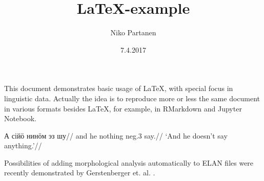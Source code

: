 \documentclass[a4paper, 12pt, english]{article}
\title{\LaTeX-example}
\author{Niko Partanen}
\date{7.4.2017}
\begin{document}
\maketitle 

This document demonstrates basic usage of \LaTeX, with special focus in linguistic data. Actually the idea is to reproduce more or less the same document in various formats besides LaTeX, for example, in RMarkdown and Jupyter Notebook.


\ex
\begingl
\gla А сійӧ нинӧм эз шу//
\glb and he nothing neg.3 say.//
\glft ‘And he doesn't say anything.’//
\endgl
\xe 

Possibilities of adding morphological analysis automatically to ELAN files were recently demonstrated by Gerstenberger et. al. \cite{gerstenbergerEtAl2017b}.
   
 
\end{document}
